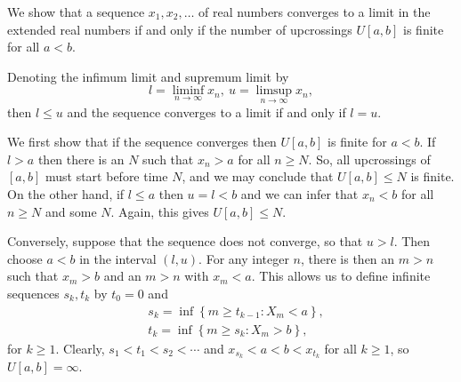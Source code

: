 \documentclass[12pt]{article}
\begin{document}

We show that a sequence $x_1,x_2,\ldots$ of real numbers converges to a limit in the extended real numbers if and only if the number of upcrossings $U[a,b]$ is finite for all $a<b$.

Denoting the infimum limit and supremum limit by
\begin{equation*}
l = \liminf_{n\rightarrow\infty}x_n,\ u=\limsup_{n\rightarrow\infty}x_n,
\end{equation*}
then $l\le u$ and the sequence converges to a limit if and only if $l=u$.

We first show that if the sequence converges then $U[a,b]$ is finite for $a<b$. If $l>a$ then there is an $N$ such that $x_n>a$ for all $n\ge N$. So, all upcrossings of $[a,b]$ must start before time $N$, and we may conclude that $U[a,b]\le N$ is finite. On the other hand, if $l\le a$ then $u=l<b$ and we can infer that $x_n<b$ for all $n\ge N$ and some $N$. Again, this gives $U[a,b]\le N$.

Conversely, suppose that the sequence does not converge, so that $u>l$. Then choose $a<b$ in the interval $(l,u)$. For any integer $n$, there is then an $m>n$ such that $x_m>b$ and an $m>n$ with $x_m<a$. This allows us to define infinite sequences $s_k,t_k$ by $t_0=0$ and
\begin{align*}
&s_k=\inf\left\{m\ge t_{k-1}\colon X_{m}<a\right\},\\
&t_k=\inf\left\{m\ge s_{k}\colon X_{m}>b\right\},
\end{align*}
for $k\ge 1$. Clearly, $s_1<t_1<s_2<\cdots$ and $x_{s_k}<a<b<x_{t_k}$ for all $k\ge 1$, so $U[a,b]=\infty$.

\end{document}
